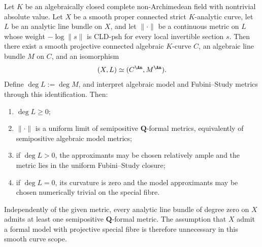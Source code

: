 
\begin{corollary}
\label{cor:p082-smooth-strict-curve-transfer}
Let \(K\) be an algebraically closed complete non-Archimedean field with
nontrivial absolute value. Let \(X\) be a smooth proper connected strict
\(K\)-analytic curve, let \(L\) be an analytic line bundle on \(X\), and let
\(\lVert\cdot\rVert\) be a continuous metric on \(L\) whose weight
\(-\log\lVert s\rVert\) is CLD-psh for every local invertible section \(s\).
Then there exist a smooth projective connected algebraic \(K\)-curve \(C\),
an algebraic line bundle \(M\) on \(C\), and an isomorphism
\[
                    (X,L)\simeq(C^{\An},M^{\An}).
\]
Define \(\deg L:=\deg M\), and interpret algebraic model and
Fubini--Study metrics through this identification. Then:
\begin{enumerate}
\item \(\deg L\geq0\);
\item \(\lVert\cdot\rVert\) is a uniform limit of semipositive
      \(\mathbf Q\)-formal metrics, equivalently of semipositive algebraic
      model metrics;
\item if \(\deg L>0\), the approximants may be chosen relatively ample and
      the metric lies in the uniform Fubini--Study closure;
\item if \(\deg L=0\), its curvature is zero and the model approximants may
      be chosen numerically trivial on the special fibre.
\end{enumerate}
Independently of the given metric, every analytic line bundle of degree zero
on \(X\) admits at least one semipositive \(\mathbf Q\)-formal metric. The
assumption that \(X\) admit a formal model with projective special fibre is
therefore unnecessary in this smooth curve scope.
\end{corollary}

